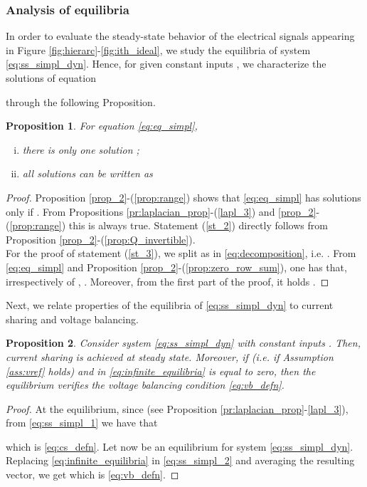 \documentclass[a4paper]{article}
\theoremstyle{plain}
\newtheorem{prp}{Proposition}
\begin{document}
\subsubsection{Analysis of equilibria}
\label{sec:eq_an_1}
In order to evaluate the steady-state behavior of the electrical
signals appearing in Figure \ref{fig:hierarc}-\ref{fig:ith_ideal},
we study the equilibria of system \eqref{eq:ss_simpl_dyn}. Hence, for given constant inputs , we characterize the solutions  of equation

through the following Proposition.
\begin{prp}
	\label{prop:equilibrium}
	For equation \eqref{eq:eq_simpl},
	\begin{enumerate}[(i)]
		\item \label{st_2} there is only one solution ;
		\item \label{st_3} all solutions  can be written as
		
	\end{enumerate}
\end{prp}
\begin{proof}
	Proposition \ref{prop_2}-(\ref{prop:range}) shows that
	\eqref{eq:eq_simpl} has solutions only if . From
	Propositions \ref{pr:laplacian_prop}-(\ref{lapl_3}) and
	\ref{prop_2}-(\ref{prop:range}) this is always true. Statement (\ref{st_2}) directly follows from Proposition \ref{prop_2}-(\ref{prop:Q_invertible}).\\
	For the proof of statement (\ref{st_3}), we split  as in \eqref{eq:decomposition}, i.e. . From \eqref{eq:eq_simpl} and Proposition
	\ref{prop_2}-(\ref{prop:zero_row_sum}), one has that, irrespectively
	of , . Moreover, from the first part of the proof, it holds .
\end{proof}
Next, we relate properties of
the equilibria of \eqref{eq:ss_simpl_dyn} to current sharing and voltage balancing.
\begin{prp}
	\label{prop:volt_bal}
	Consider system \eqref{eq:ss_simpl_dyn} with constant inputs
	. Then, current sharing is achieved at steady state. Moreover, if  (i.e. if Assumption \ref{ass:vref} holds) and 
	in \eqref{eq:infinite_equilibria} is equal to zero, then the
	equilibrium  verifies the voltage balancing condition \eqref{eq:vb_defn}.
\end{prp}
\begin{proof}
	At the equilibrium, since  (see Proposition \ref{pr:laplacian_prop}-\eqref{lapl_3}), from \eqref{eq:ss_simpl_1} we have that 
	
	which is \eqref{eq:cs_defn}. 
	Let now  be an equilibrium for system \eqref{eq:ss_simpl_dyn}. Replacing \eqref{eq:infinite_equilibria} in \eqref{eq:ss_simpl_2} and averaging the resulting vector, we get
	 which is \eqref{eq:vb_defn}.
\end{proof}
\end{document}
